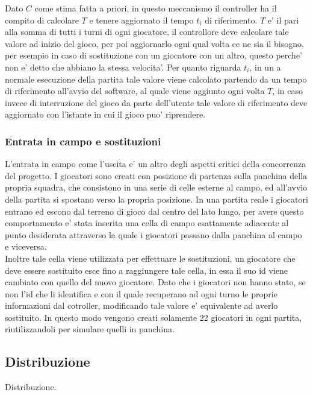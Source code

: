 Dato $C$ come stima fatta a priori, in questo meccanismo il controller ha il compito di calcolare $T$ e tenere aggiornato il tempo $t_i$ di riferimento. $T$ e' il pari alla somma di tutti i turni di ogni giocatore, il controllore deve calcolare tale valore ad inizio del gioco, per poi aggiornarlo ogni qual volta ce ne sia il bisogno, per esempio in caso di sostituzione con un giocatore con un altro, questo perche' non e' detto che abbiano la stessa velocita'. Per quanto riguarda $t_i$, in un
a normale esecuzione della partita tale valore viene calcolato partendo da un tempo di riferimento all'avvio del software, al quale viene aggiunto ogni volta $T$, in caso invece di interruzione del gioco da parte dell'utente tale valore di riferimento deve aggiornato con l'istante in cui il gioco puo' riprendere.

\subsubsection{Entrata in campo e sostituzioni}
\label{sec:analisi_concorrenza_uscita_campo}

L'entrata in campo come l'uscita e' un altro degli aspetti critici della concorrenza del progetto. I giocatori sono creati con posizione di partenza sulla panchina della propria squadra, che consistono in una serie di celle esterne al campo, ed all'avvio della partita si spostano verso la propria posizione. In una partita reale i giocatori entrano ed escono dal terreno di gioco dal centro del lato lungo, per avere questo comportamento e' stata inserita una cella di campo esattamente adiacente al punto desiderata attraverso la quale i giocatori passano dalla panchina al campo e viceversa.\\

Inoltre tale cella viene utilizzata per effettuare le sostituzioni, un giocatore che deve essere sostituito esce fino a raggiungere tale cella, in essa il suo id viene cambiato con quello del nuovo giocatore. Dato che i giocatori non hanno stato, se non l'id che li identifica e con il quale recuperano ad ogni turno le proprie informazioni dal cotroller, modificando tale valore e' equivalente ad averlo sostituito. In questo modo vengono creati solamente 22 giocatori in ogni partita, riutilizzandoli per simulare quelli in panchina.


\subsection{Distribuzione}
\label{sec:analisi_distribuzione}

Distribuzione.


